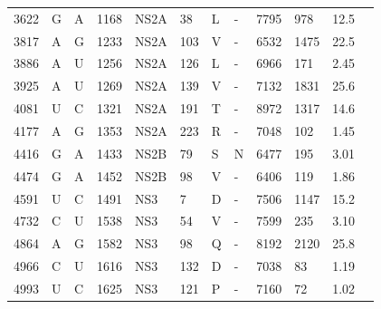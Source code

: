 \begin{longtabu}{X[l]X[l]X[l]X[l]X[l]X[l]X[l]X[l]X[l]X[l]X[l]X[l]}
		3622     & G    & A            & 1168              & NS2A  & 38          & L                  & -                 & 7795           & 978              & 12.5   \\
		3817     & A    & G          & 1233              & NS2A  & 103         & V                  & -                 & 6532           & 1475             & 22.5   \\
		3886     & A    & U            & 1256              & NS2A  & 126         & L                  & -                 & 6966           & 171              & 2.45   \\
		3925     & A    & U            & 1269              & NS2A  & 139         & V                  & -                 & 7132           & 1831             & 25.6   \\
		4081     & U    & C            & 1321              & NS2A  & 191         & T                  & -                 & 8972           & 1317             & 14.6   \\
		4177     & A    & G            & 1353              & NS2A  & 223         & R                  & -                 & 7048           & 102              & 1.45   \\
		4416     & G    & A            & 1433              & NS2B  & 79          & S                  & N               & 6477           & 195              & 3.01   \\
		4474     & G    & A            & 1452              & NS2B  & 98          & V                  & -                 & 6406           & 119              & 1.86   \\
		4591     & U    & C            & 1491              & NS3   & 7           & D                  & -                 & 7506           & 1147             & 15.2   \\
		4732     & C    & U            & 1538              & NS3   & 54          & V                  & -                 & 7599           & 235              & 3.10   \\
		4864     & A    & G          & 1582              & NS3   & 98          & Q                  & -                 & 8192           & 2120             & 25.8   \\
		4966     & C    & U            & 1616              & NS3   & 132         & D                  & -                 & 7038           & 83               & 1.19   \\
		4993     & U    & C            & 1625              & NS3   & 121         & P                  & -                 & 7160           & 72               & 1.02   \\

\end{longtabu}
